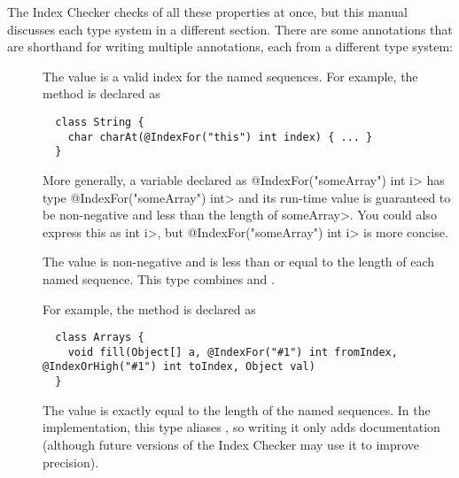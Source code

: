 The Index Checker checks of all these properties at once, but
this manual discusses each type system in a different section.
There are some annotations that are shorthand for writing multiple
annotations, each from a different type system:

\begin{description}
\item[]
  The value is a valid index for the named sequences.  For example, the
  method is declared as

  \begin{Verbatim}
  class String {
    char charAt(@IndexFor("this") int index) { ... }
  }
  \end{Verbatim}

  More generally, a variable
  declared as \<@IndexFor("someArray") int i> has type
  \<@IndexFor("someArray") int> and its run-time value is guaranteed to be
  non-negative and less than the length of \<someArray>.  You could also
  express this as
  \<
  int i>,
  but \<@IndexFor("someArray") int i> is more concise.

 \item[]
   The value is non-negative and is less than or equal to the length of
   each named sequence.  This type combines
   and
  .

  For example, the
   method is declared as

  \begin{mysmall}
  \begin{Verbatim}
  class Arrays {
    void fill(Object[] a, @IndexFor("#1") int fromIndex, @IndexOrHigh("#1") int toIndex, Object val)
  }
  \end{Verbatim}
  \end{mysmall}

 \item[]
   The value is exactly equal to the length of the named
   sequences. In the implementation, this type aliases
   , so writing it
   only adds documentation (although future versions of the Index Checker
   may use it to improve precision).


\end{description}
